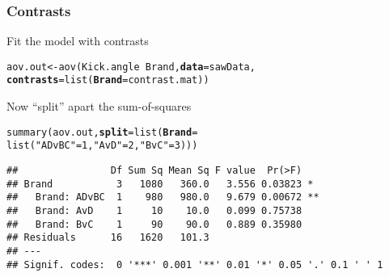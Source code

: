 \documentclass[color=usenames,dvipsnames]{beamer}\usepackage[]{graphicx}\usepackage[]{color}
\makeatletter
\newcommand{\hlnum}[1]{\textcolor[rgb]{0.69,0.494,0}{#1}}%
\newcommand{\hlstr}[1]{\textcolor[rgb]{0.749,0.012,0.012}{#1}}%
\newcommand{\hlopt}[1]{\textcolor[rgb]{0,0,0}{#1}}%
\newcommand{\hlstd}[1]{\textcolor[rgb]{0,0,0}{#1}}%
\newcommand{\hlkwb}[1]{\textcolor[rgb]{0,0.341,0.682}{#1}}%
\newcommand{\hlkwc}[1]{\textcolor[rgb]{0,0,0}{\textbf{#1}}}%
\newcommand{\hlkwd}[1]{\textcolor[rgb]{0.004,0.004,0.506}{#1}}%
\newenvironment{kframe}{%
 \def\at@end@of@kframe{}%
 \ifinner\ifhmode%
  \def\at@end@of@kframe{\end{minipage}}%
  \begin{minipage}{\columnwidth}%
 \fi\fi%
 \def\FrameCommand##1{\hskip\@totalleftmargin \hskip-\fboxsep
 \colorbox{shadecolor}{##1}\hskip-\fboxsep
     \hskip-\linewidth \hskip-\@totalleftmargin \hskip\columnwidth}%
 \MakeFramed {\advance\hsize-\width
   \@totalleftmargin\z@ \linewidth\hsize
   \@setminipage}}%
 {\par\unskip\endMakeFramed%
 \at@end@of@kframe}
\newenvironment{knitrout}{}{} %
\makeatother
\begin{document}





\begin{frame}[fragile]
  \frametitle{Contrasts}
  {%
    Fit the model with contrasts}
\begin{knitrout}\footnotesize
{}\color{fgcolor}\begin{kframe}
\begin{alltt}
\hlstd{aov.out} \hlkwb{<-} \hlkwd{aov}\hlstd{(Kick.angle} \hlopt{~} \hlstd{Brand,} \hlkwc{data}\hlstd{=sawData,}
               \hlkwc{contrasts}\hlstd{=}\hlkwd{list}\hlstd{(}\hlkwc{Brand}\hlstd{=contrast.mat))}
\end{alltt}
\end{kframe}
\end{knitrout}
\pause
\vfill
{%
  Now ``split'' apart the sum-of-squares}
\begin{knitrout}\footnotesize
{}\color{fgcolor}\begin{kframe}
\begin{alltt}
\hlkwd{summary}\hlstd{(aov.out,} \hlkwc{split} \hlstd{=} \hlkwd{list}\hlstd{(}\hlkwc{Brand} \hlstd{=}
                      \hlkwd{list}\hlstd{(}\hlstr{"ADvBC"}\hlstd{=}\hlnum{1}\hlstd{,} \hlstr{"AvD"}\hlstd{=}\hlnum{2}\hlstd{,} \hlstr{"BvC"}\hlstd{=}\hlnum{3}\hlstd{)))}
\end{alltt}
\begin{verbatim}
##                Df Sum Sq Mean Sq F value  Pr(>F)   
## Brand           3   1080   360.0   3.556 0.03823 * 
##   Brand: ADvBC  1    980   980.0   9.679 0.00672 **
##   Brand: AvD    1     10    10.0   0.099 0.75738   
##   Brand: BvC    1     90    90.0   0.889 0.35980   
## Residuals      16   1620   101.3                   
## ---
## Signif. codes:  0 '***' 0.001 '**' 0.01 '*' 0.05 '.' 0.1 ' ' 1
\end{verbatim}
\end{kframe}
\end{knitrout}
\end{frame}
\end{document}
